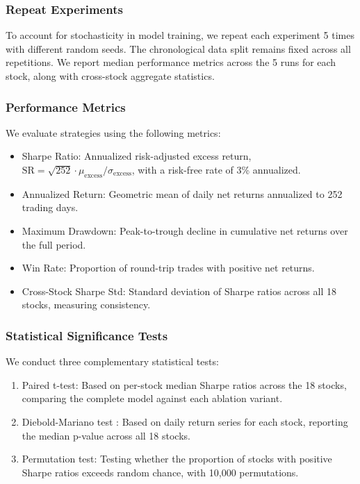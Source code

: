 \documentclass[review]{elsarticle}
\begin{document}
\subsubsection{Repeat Experiments}

To account for stochasticity in model training, we repeat each experiment 5 times with different random seeds. The chronological data split remains fixed across all repetitions. We report median performance metrics across the 5 runs for each stock, along with cross-stock aggregate statistics.

\subsubsection{Performance Metrics}

We evaluate strategies using the following metrics:
\begin{itemize}
\item Sharpe Ratio: Annualized risk-adjusted excess return, $\text{SR} = \sqrt{252} \cdot \mu_{\text{excess}} / \sigma_{\text{excess}}$, with a risk-free rate of 3\% annualized.
\item Annualized Return: Geometric mean of daily net returns annualized to 252 trading days.
\item Maximum Drawdown: Peak-to-trough decline in cumulative net returns over the full period.
\item Win Rate: Proportion of round-trip trades with positive net returns.
\item Cross-Stock Sharpe Std: Standard deviation of Sharpe ratios across all 18 stocks, measuring consistency.
\end{itemize}

\subsubsection{Statistical Significance Tests}

We conduct three complementary statistical tests:
\begin{enumerate}
\item Paired t-test: Based on per-stock median Sharpe ratios across the 18 stocks, comparing the complete model against each ablation variant.
\item Diebold-Mariano test \citep{diebold1995comparing}: Based on daily return series for each stock, reporting the median p-value across all 18 stocks.
\item Permutation test: Testing whether the proportion of stocks with positive Sharpe ratios exceeds random chance, with 10,000 permutations.
\end{enumerate}
\end{document}
